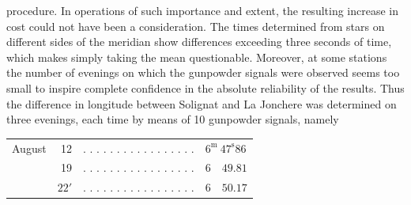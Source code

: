 procedure. In operations of such importance and extent, the resulting increase in cost could not have been a consideration. The times determined from stars on different sides of the meridian show differences exceeding three seconds of time, which makes simply taking the mean questionable. Moreover, at some stations the number of evenings on which the gunpowder signals were observed seems too small to inspire complete confidence in the absolute reliability of the results. Thus the difference in longitude between Solignat and La Jonchere was determined on three evenings, each time by means of 10 gunpowder signals, namely

\begin{center}\small\setlength{\tabcolsep}{3pt}
\begin{tabular}{lrll}
August & 12 & . . . . . . . . . . . . . . . . . & $6^{\mathrm m}\ 47^{\mathrm s}86$ \\
 & 19 & . . . . . . . . . . . . . . . . . & $6\quad49.81$ \\
 & $22'$ & . . . . . . . . . . . . . . . . . & $6\quad50.17$ \\
\end{tabular}\end{center}
